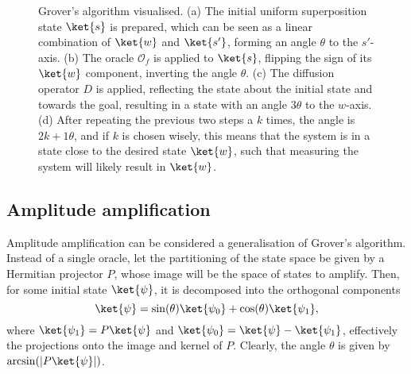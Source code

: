 \begin{figure}
    \caption[
        Grover's algorithm.
    ]
    {
        Grover's algorithm visualised.
        (a) The initial uniform superposition state $\ket{s}$ is prepared, which can be seen as a linear combination of $\ket{w}$ and $\ket{s'}$, forming an angle $\theta$ to the $s'$-axis.
        (b) The oracle $\mathcal{O}_f$ is applied to $\ket{s}$, flipping the sign of its $\ket{w}$ component, inverting the angle $\theta$.
        (c) The diffusion operator $D$ is applied, reflecting the state about the initial state and towards the goal, resulting in a state with an angle $3\theta$ to the $w$-axis.
        (d) After repeating the previous two steps a $k$ times, the angle is $2k+1\theta$, and if $k$ is chosen wisely, this means that the system is in a state close to the desired state $\ket{w}$, such that measuring the system will likely result in $\ket{w}$.
    }
    \label{fig:grover}
\end{figure}

\subsection{Amplitude amplification}
\label{sec:amplitude-amplification}
Amplitude amplification can be considered a generalisation of Grover's algorithm.
Instead of a single oracle, let the partitioning of the state space be given by a Hermitian projector $P$, whose image will be the space of states to amplify.
Then, for some initial state $\ket{\psi}$, it is decomposed into the orthogonal components
\begin{equation}
    \ket{\psi} = \sin(\theta)\ket{\psi_0} + \cos(\theta)\ket{\psi_1},
\end{equation}
where $\ket{\psi_1} = P\ket{\psi}$ and $\ket{\psi_0} = \ket{\psi} - \ket{\psi_1}$, effectively the projections onto the image and kernel of $P$.
Clearly, the angle $\theta$ is given by $\arcsin(|P\ket{\psi}|)$.

